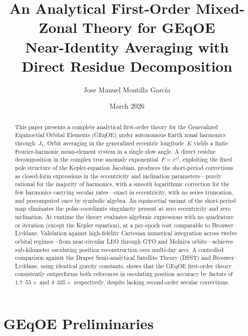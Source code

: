 \documentclass[11pt]{article}
\title{An Analytical First-Order Mixed-Zonal Theory for GEqOE\\
\large Near-Identity Averaging with Direct Residue Decomposition}
\author{Jose Manuel Montilla García}
\date{March 2026}
\begin{document}
\maketitle

\begin{abstract}
This paper presents a complete analytical first-order theory for the
Generalized Equinoctial Orbital Elements (GEqOE) under autonomous Earth
zonal harmonics through~$J_5$.
%
Orbit averaging in the generalized eccentric longitude~$K$ yields a
finite Fourier-harmonic mean-element system in a single slow angle.
%
A direct residue decomposition in the complex true anomaly
exponential~$F = e^{if}$, exploiting the fixed pole structure of the
Kepler-equation Jacobian, produces the short-period corrections as
closed-form expressions in the eccentricity and inclination
parameters---purely rational for the majority of harmonics, with a smooth
logarithmic correction for the few harmonics carrying secular
rates---exact in eccentricity, with no series truncation, and precomputed
once by symbolic algebra.
%
An equinoctial variant of the short-period map eliminates the
polar-coordinate singularity present at zero eccentricity and zero
inclination.
%
At runtime the theory evaluates algebraic expressions with no quadrature
or iteration (except the Kepler equation), at a per-epoch cost comparable
to Brouwer--Lyddane.
%
Validation against high-fidelity Cartesian numerical integration across
twelve orbital regimes---from near-circular LEO through GTO and Molniya
orbits---achieves sub-kilometer osculating position reconstruction over
multi-day arcs.
%
A controlled comparison against the Draper Semi-analytical Satellite
Theory (DSST) and Brouwer--Lyddane, using identical gravity constants,
shows that the GEqOE first-order theory consistently outperforms both
references in osculating position accuracy by factors of
$1.7$--$55\times$ and $4$--$335\times$ respectively, despite lacking
second-order secular corrections.
\end{abstract}



\section{GEqOE Preliminaries}
\label{sec:prelim}
\end{document}
